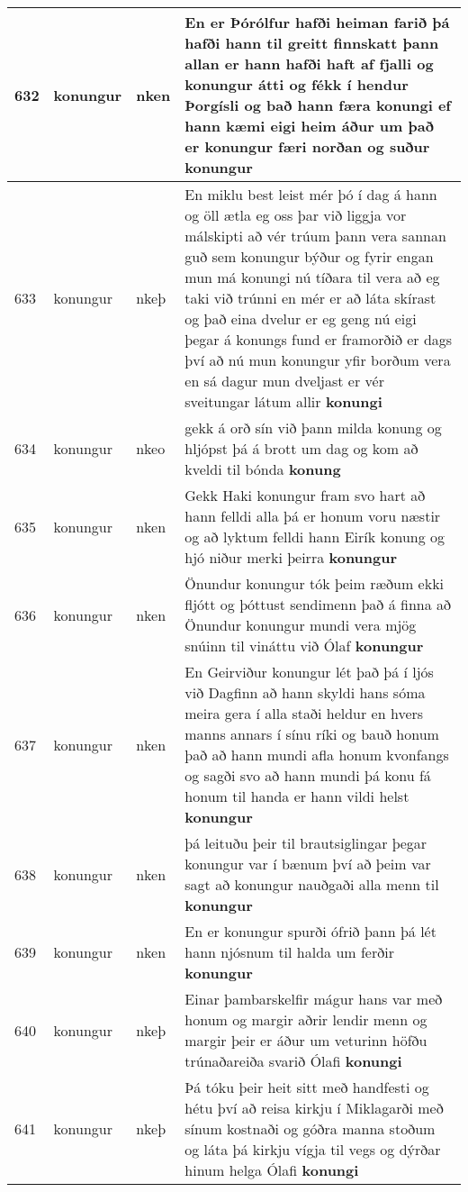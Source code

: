 \documentclass{article}
\begin{document}
\begin{longtable}{p{1cm}|p{1cm}|p{1cm}|p{13cm}}
\hline
632&konungur&nken&En er Þórólfur hafði heiman farið þá hafði hann til greitt finnskatt þann allan er hann hafði haft af fjalli og konungur átti og fékk í hendur Þorgísli og bað hann færa konungi ef hann kæmi eigi heim áður um það er konungur færi norðan og suður \textbf{konungur} \\
\hline
633&konungur&nkeþ&En miklu best leist mér þó í dag á hann og öll ætla eg oss þar við liggja vor málskipti að vér trúum þann vera sannan guð sem konungur býður og fyrir engan mun má konungi nú tíðara til vera að eg taki við trúnni en mér er að láta skírast og það eina dvelur er eg geng nú eigi þegar á konungs fund er framorðið er dags því að nú mun konungur yfir borðum vera en sá dagur mun dveljast er vér sveitungar látum allir \textbf{konungi} \\
\hline
634&konungur&nkeo&gekk á orð sín við þann milda konung og hljópst þá á brott um dag og kom að kveldi til bónda \textbf{konung} \\
\hline
635&konungur&nken&Gekk Haki konungur fram svo hart að hann felldi alla þá er honum voru næstir og að lyktum felldi hann Eirík konung og hjó niður merki þeirra \textbf{konungur} \\
\hline
636&konungur&nken&Önundur konungur tók þeim ræðum ekki fljótt og þóttust sendimenn það á finna að Önundur konungur mundi vera mjög snúinn til vináttu við Ólaf \textbf{konungur} \\
\hline
637&konungur&nken&En Geirviður konungur lét það þá í ljós við Dagfinn að hann skyldi hans sóma meira gera í alla staði heldur en hvers manns annars í sínu ríki og bauð honum það að hann mundi afla honum kvonfangs og sagði svo að hann mundi þá konu fá honum til handa er hann vildi helst \textbf{konungur} \\
\hline
638&konungur&nken&þá leituðu þeir til brautsiglingar þegar konungur var í bænum því að þeim var sagt að konungur nauðgaði alla menn til \textbf{konungur} \\
\hline
639&konungur&nken&En er konungur spurði ófrið þann þá lét hann njósnum til halda um ferðir \textbf{konungur} \\
\hline
640&konungur&nkeþ&Einar þambarskelfir mágur hans var með honum og margir aðrir lendir menn og margir þeir er áður um veturinn höfðu trúnaðareiða svarið Ólafi \textbf{konungi} \\
\hline
641&konungur&nkeþ&Þá tóku þeir heit sitt með handfesti og hétu því að reisa kirkju í Miklagarði með sínum kostnaði og góðra manna stoðum og láta þá kirkju vígja til vegs og dýrðar hinum helga Ólafi \textbf{konungi} \\

\end{longtable}
\end{document}

